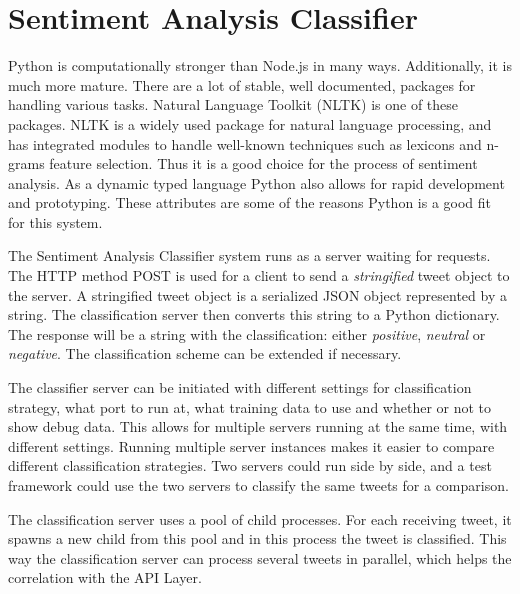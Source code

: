 \section{Sentiment Analysis Classifier}

Python is computationally stronger than Node.js in many ways. Additionally, it is much more mature. There are a lot of stable, well documented, packages for handling various tasks. Natural Language Toolkit (NLTK) is one of these packages. NLTK is a widely used package for natural language processing, and has integrated modules to handle well-known techniques such as lexicons and n-grams feature selection. Thus it is a good choice for the process of sentiment analysis. As a dynamic typed language Python also allows for rapid development and prototyping. These attributes are some of the reasons Python is a good fit for this system. 

The Sentiment Analysis Classifier system runs as a server waiting for requests. The HTTP method POST is used for a client to send a \textit{stringified} tweet object to the server. A stringified tweet object is a serialized JSON object represented by a string. The classification server then converts this string to a Python dictionary. The response will be a string with the classification: either \textit{positive}, \textit{neutral} or \textit{negative}. The classification scheme can be extended if necessary. 

The classifier server can be initiated with different settings for classification strategy, what port to run at, what training data to use and whether or not to show debug data. This allows for multiple servers running at the same time, with different settings. Running multiple server instances makes it easier to compare different classification strategies. Two servers could run side by side, and a test framework could use the two servers to classify the same tweets for a comparison.

The classification server uses a pool of child processes. For each receiving tweet, it spawns a new child from this pool and in this process the tweet is classified. This way the classification server can process several tweets in parallel, which helps the correlation with the API Layer.


